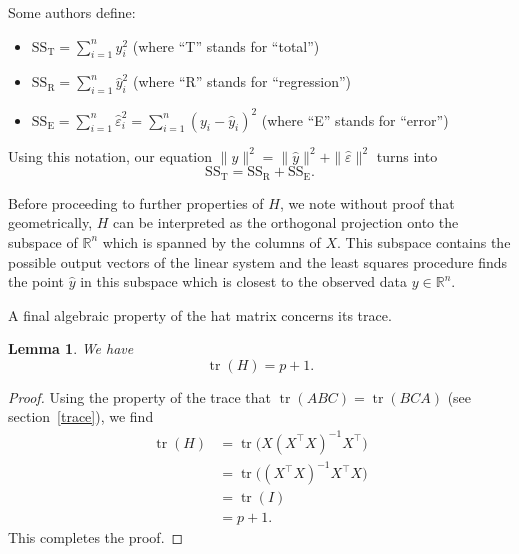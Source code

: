 \documentclass[
  a4paper,
]{article}
\providecommand{\tightlist}{%
  \setlength{\itemsep}{0pt}\setlength{\parskip}{0pt}}
\newtheorem{lemma}{Lemma}[section]
\theoremstyle{definition}
\theoremstyle{definition}
\theoremstyle{definition}
\theoremstyle{definition}
\theoremstyle{remark}
\begin{document}
Some authors define:

\begin{itemize}
\tightlist
\item
  \(\mathrm{SS}_\mathrm{T} = \sum_{i=1}^n y_i^2\) (where ``T'' stands for ``total'')
\item
  \(\mathrm{SS}_\mathrm{R} = \sum_{i=1}^n \hat y_i^2\) (where ``R'' stands for ``regression'')
\item
  \(\mathrm{SS}_\mathrm{E} = \sum_{i=1}^n \hat\varepsilon_i^2 = \sum_{i=1}^n (y_i-\hat y_i)^2\) (where ``E'' stands for ``error'')
\end{itemize}

Using this notation, our equation
\(\|y\|^2 = \|\hat y\|^2 + \|\hat\varepsilon\|^2\)
turns into
\begin{equation*}
  \mathrm{SS}_\mathrm{T}
  = \mathrm{SS}_\mathrm{R} + \mathrm{SS}_\mathrm{E}.
\end{equation*}

Before proceeding to further properties of \(H\), we note without proof that
geometrically, \(H\) can be interpreted as the orthogonal projection onto
the subspace of \(\mathbb{R}^n\) which is spanned by the columns of \(X\). This subspace
contains the possible output vectors
of the linear system and the least squares procedure finds the point \(\hat y\)
in this subspace which is closest to the observed data \(y\in\mathbb{R}^n\).

A final algebraic property of the hat matrix concerns its trace.

\begin{lemma}
We have
\begin{equation}
  \mathop{\mathrm{tr}}(H) = p+1.  \label{eq:tr-H}
\end{equation}
\end{lemma}

\begin{proof}
Using the property of the trace that \(\mathop{\mathrm{tr}}(ABC) = \mathop{\mathrm{tr}}(BCA)\) (see section~\ref{trace}),
we find
\begin{align*}
  \mathop{\mathrm{tr}}(H)
  &= \mathop{\mathrm{tr}}\bigl( X (X^\top X)^{-1} X^\top \bigr) \\
  &= \mathop{\mathrm{tr}}\bigl( (X^\top X)^{-1} X^\top X \bigr) \\
  &= \mathop{\mathrm{tr}}(I) \\
  &= p+1.
\end{align*}
This completes the proof.
\end{proof}
\end{document}
